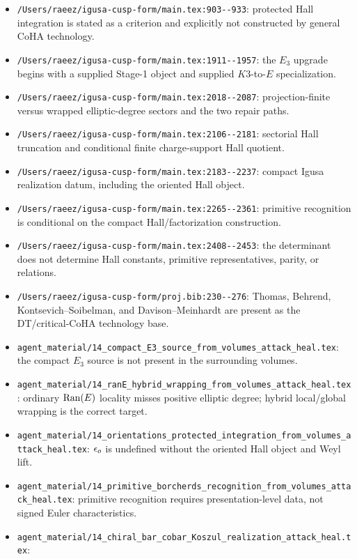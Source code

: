\begin{itemize}
\item \verb|/Users/raeez/igusa-cusp-form/main.tex:903--933|:
protected Hall integration is stated as a criterion and explicitly not
constructed by general CoHA technology.
\item \verb|/Users/raeez/igusa-cusp-form/main.tex:1911--1957|:
the \(E_3\) upgrade begins with a supplied Stage-1 object and supplied
\(K3\)-to-\(E\) specialization.
\item \verb|/Users/raeez/igusa-cusp-form/main.tex:2018--2087|:
projection-finite versus wrapped elliptic-degree sectors and the two
repair paths.
\item \verb|/Users/raeez/igusa-cusp-form/main.tex:2106--2181|:
sectorial Hall truncation and conditional finite charge-support Hall quotient.
\item \verb|/Users/raeez/igusa-cusp-form/main.tex:2183--2237|:
compact Igusa realization datum, including the oriented Hall object.
\item \verb|/Users/raeez/igusa-cusp-form/main.tex:2265--2361|:
primitive recognition is conditional on the compact
Hall/factorization construction.
\item \verb|/Users/raeez/igusa-cusp-form/main.tex:2408--2453|:
the determinant does not determine Hall constants, primitive
representatives, parity, or relations.
\item \verb|/Users/raeez/igusa-cusp-form/proj.bib:230--276|:
Thomas, Behrend, Kontsevich--Soibelman, and
Davison--Meinhardt are present as the DT/critical-CoHA technology base.
\item \verb|agent_material/14_compact_E3_source_from_volumes_attack_heal.tex|:
the compact \(E_3\) source is not present in the surrounding volumes.
\item \verb|agent_material/14_ranE_hybrid_wrapping_from_volumes_attack_heal.tex|:
ordinary \(\operatorname{Ran}(E)\) locality misses positive elliptic degree; hybrid
local/global wrapping is the correct target.
\item \verb|agent_material/14_orientations_protected_integration_from_volumes_attack_heal.tex|:
\(\epsilon_o\) is undefined without the oriented Hall object and Weyl lift.
\item \verb|agent_material/14_primitive_borcherds_recognition_from_volumes_attack_heal.tex|:
primitive recognition requires presentation-level data, not signed
Euler characteristics.
\item \verb|agent_material/14_chiral_bar_cobar_Koszul_realization_attack_heal.tex|:

\end{itemize}
